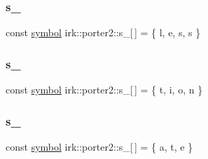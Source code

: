 \mbox{\label{namespaceirk_1_1porter2_a22ae2a7762719b143dc1f6e31a1788ee}} 
\subsubsection{\texorpdfstring{s\+\_}{s\_23}}
{\footnotesize\ttfamily const \mbox{\hyperlink{namespaceirk_1_1porter2_afd04c4eb58a1dabcf8f3ab2d7e9f9ed5}{symbol}} irk\+::porter2\+::s\+\_\mbox{[}$\,$\mbox{]} = \{ \textquotesingle{}l\textquotesingle{}, \textquotesingle{}e\textquotesingle{}, \textquotesingle{}s\textquotesingle{}, \textquotesingle{}s\textquotesingle{} \}\hspace{0.3cm}{\ttfamily [static]}}

\mbox{\label{namespaceirk_1_1porter2_a940d049c13dfa9cdcabdb9e9e3944bfa}} 
\subsubsection{\texorpdfstring{s\+\_}{s\_24}}
{\footnotesize\ttfamily const \mbox{\hyperlink{namespaceirk_1_1porter2_afd04c4eb58a1dabcf8f3ab2d7e9f9ed5}{symbol}} irk\+::porter2\+::s\+\_\mbox{[}$\,$\mbox{]} = \{ \textquotesingle{}t\textquotesingle{}, \textquotesingle{}i\textquotesingle{}, \textquotesingle{}o\textquotesingle{}, \textquotesingle{}n\textquotesingle{} \}\hspace{0.3cm}{\ttfamily [static]}}

\mbox{\label{namespaceirk_1_1porter2_acd44f7229181c29fb0118c6942b9c007}} 
\subsubsection{\texorpdfstring{s\+\_}{s\_25}}
{\footnotesize\ttfamily const \mbox{\hyperlink{namespaceirk_1_1porter2_afd04c4eb58a1dabcf8f3ab2d7e9f9ed5}{symbol}} irk\+::porter2\+::s\+\_\mbox{[}$\,$\mbox{]} = \{ \textquotesingle{}a\textquotesingle{}, \textquotesingle{}t\textquotesingle{}, \textquotesingle{}e\textquotesingle{} \}\hspace{0.3cm}{\ttfamily [static]}}

